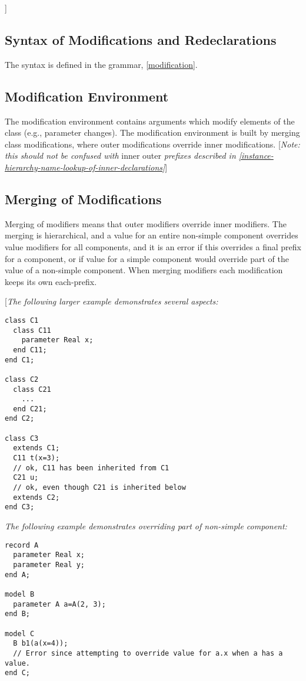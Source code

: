 {]}

\subsection{Syntax of Modifications and Redeclarations}

The syntax is defined in the grammar, \ref{modification}.

\subsection{Modification Environment}

The modification environment contains arguments which modify elements of
the class (e.g., parameter changes). The modification environment is
built by merging class modifications, where outer modifications override
inner modifications. {[}\emph{Note: this should not be confused with}
inner outer \emph{prefixes described in \ref{instance-hierarchy-name-lookup-of-inner-declarations}}{]}

\subsection{Merging of Modifications}

Merging of modifiers means that outer modifiers override inner
modifiers. The merging is hierarchical, and a value for an entire
non-simple component overrides value modifiers for all components, and
it is an error if this overrides a final prefix for a component, or if
value for a simple component would override part of the value of a
non-simple component. When merging modifiers each modification keeps its
own each-prefix.

{[}\emph{The following larger example demonstrates several aspects:}
\begin{lstlisting}[language=modelica]
class C1
  class C11
    parameter Real x;
  end C11;
end C1;

class C2
  class C21
    ...
  end C21;
end C2;

class C3
  extends C1;
  C11 t(x=3);
  // ok, C11 has been inherited from C1
  C21 u;
  // ok, even though C21 is inherited below
  extends C2;
end C3;
\end{lstlisting}
\emph{The following example demonstrates overriding part of non-simple
component: }
\begin{lstlisting}[language=modelica]
record A
  parameter Real x;
  parameter Real y;
end A;

model B
  parameter A a=A(2, 3);
end B;

model C
  B b1(a(x=4));
  // Error since attempting to override value for a.x when a has a value.
end C;
\end{lstlisting}

